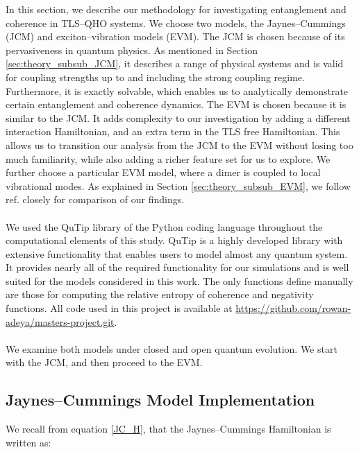 \documentclass[11pt]{article}
\begin{document}
In this section, we describe our methodology for investigating entanglement and coherence in TLS--QHO systems. We choose two models, the Jaynes--Cummings (JCM) and exciton--vibration models (EVM). The JCM is chosen because of its pervasiveness in quantum physics. As mentioned in Section \ref{sec:theory_subsub_JCM}, it describes a range of physical systems and is valid for coupling strengths up to and including the strong coupling regime. Furthermore, it is exactly solvable, which enables us to analytically demonstrate certain entanglement and coherence dynamics. 
The EVM is chosen because it is similar to the JCM. It adds complexity to our investigation by adding a different interaction Hamiltonian, and an extra term in the TLS  free Hamiltonian. This allows us to transition our analysis from the JCM to the EVM without losing too much familiarity, while also adding a richer feature set for us to explore. We further choose a particular EVM model, where a dimer is coupled to local vibrational modes. As explained in Section \ref{sec:theory_subsub_EVM}, we follow ref. \cite{ExVib2014-Alexandra} closely for comparison of our findings. \\
\\
We used the QuTip library of the Python coding language throughout the computational elements of this study. QuTip is a highly developed library with extensive functionality that enables users to model almost any quantum system. It provides nearly all of the required functionality for our simulations and is well suited for the models considered in this work. The only functions define manually are those for computing the relative entropy of coherence and negativity functions. All code used in this project is available at \href{https://github.com/rowan-adeya/masters-project.git}{https://github.com/rowan-adeya/masters-project.git}.\\
\\
We examine both models under closed and open quantum evolution. We start with the JCM, and then proceed to the EVM.

\subsection{Jaynes--Cummings Model Implementation} \label{sec:method_sub_JCM}

We recall from equation \eqref{JC_H}, that the Jaynes--Cummings Hamiltonian is written as:
\end{document}
